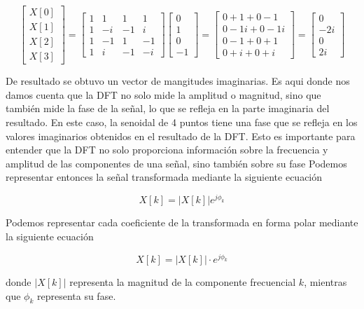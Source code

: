 \documentclass[12pt]{article}
\begin{document}
$$
\begin{bmatrix}
X[0] \\
X[1] \\
X[2] \\
X[3]
\end{bmatrix}
=
\begin{bmatrix}       
1 & 1 & 1 & 1 \\
1 & -i & -1 & i \\
1 & -1 & 1 & -1 \\
1 & i & -1 & -i
\end{bmatrix}
\begin{bmatrix}
0 \\
1 \\
0 \\
-1
\end{bmatrix}
=
\begin{bmatrix}       
0 + 1  + 0 -1 \\
0 - 1i + 0 - 1i \\
0 - 1 + 0 + 1 \\
0 + i + 0 + i
\end{bmatrix}=
\begin{bmatrix}       
0 \\
-2i\\
0 \\
2i
\end{bmatrix}
$$

De resultado se obtuvo un vector de mangitudes imaginarias. Es aqui donde nos damos cuenta que la DFT no solo mide la amplitud o magnitud, sino que también mide la fase de la señal, lo que se refleja en la parte imaginaria del resultado. En este caso, la senoidal de 4 puntos tiene una fase que se refleja en los valores imaginarios obtenidos en el resultado de la DFT. Esto es importante para entender que la DFT no solo proporciona información sobre la frecuencia y amplitud de las componentes de una señal, sino también sobre su fase
Podemos representar entonces la señal transformada mediante la siguiente ecuación

$$
X[k] = |X[k]| e^{j \phi_k}

$$



Podemos representar cada coeficiente de la transformada en forma polar mediante la siguiente ecuación

$$
X[k] = |X[k]|  \cdot e^{j \phi_k}
$$

donde \( |X[k]| \) representa la magnitud de la componente frecuencial \(k\), mientras que \( \phi_k \) representa su fase.
\end{document}
